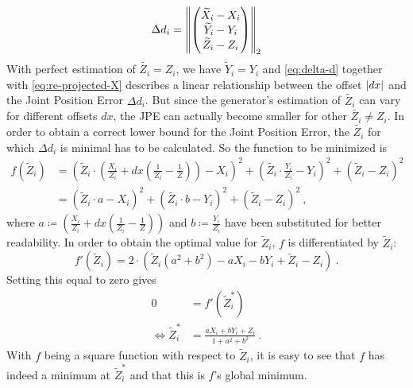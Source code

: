 \begin{equation}
\label{eq:delta-d}
	\Delta d_i = \norm{ 
	\begin{pmatrix}
		\widetilde{X}_i - X_i \\
		\widetilde{Y}_i - Y_i \\
		\widetilde{Z}_i - Z_i
	\end{pmatrix}
	}_2
\end{equation}
With perfect estimation of $\widetilde{Z_i} = Z_i$, we have $\widetilde{Y}_i = Y_i$ and \autoref{eq:delta-d} together with \autoref{eq:re-projected-X} describes a linear relationship between the offset $\abs{dx}$ and the Joint Position Error $\Delta d_i$.
But since the generator's estimation of $\widetilde{Z_i}$ can vary for different offsets $dx$, the JPE can actually become smaller for other $\widetilde{Z_i} \neq Z_i$. 
In order to obtain a correct lower bound for the Joint Position Error, the $\widetilde{Z_i}$ for which $\Delta d_i$ is minimal has to be calculated.
So the function to be minimized is
\begin{align}
	\label{eq:minimum-distance}
	f(\widetilde{Z}_i) &= \left ( \widetilde{Z}_i \cdot \left( \frac{X_i}{Z_i} + dx \left( \frac{1}{Z_i} - \frac{1}{Z} \right) \right ) - X_i \right)^2 + \left ( \widetilde{Z_i} \cdot \frac{Y_i}{Z_i} - Y_i \right )^2 + \left ( \widetilde{Z}_i - Z_i \right ) ^2 \\
	&= \left ( \widetilde{Z}_i \cdot a - X_i \right)^2 + \left ( \widetilde{Z_i} \cdot b - Y_i \right )^2 + \left ( \widetilde{Z}_i - Z_i \right )^2 \ ,
\end{align}
where $a \coloneqq \left( \frac{X_i}{Z_i} + dx \left( \frac{1}{Z_i} - \frac{1}{Z} \right) \right )$ and $b \coloneqq \frac{Y_i}{Z_i}$ have been substituted for better readability.
In order to obtain the optimal value for $\widetilde{Z}_i$, $f$ is differentiated by $\widetilde{Z}_i$:
\begin{equation}
	\label{eq:derivative-minimum-distance}
	f'(\widetilde{Z}_i) = 2 \cdot \left ( \widetilde{Z}_i \left (a^2 + b^2 \right ) - a X_i - b Y_i + \widetilde{Z}_i - Z_i \right ) \ .
\end{equation}
Setting this equal to zero gives
\begin{align}
	0 &= f'(\widetilde{Z}_i^\ast) \\
	\Leftrightarrow \widetilde{Z}_i^\ast & = \frac{a X_i + b Y_i + Z_i}{1 + a^2 + b^2} \ .
	\label{eq:z_i-min}
\end{align}
With $f$ being a square function with respect to $\widetilde{Z}_i$, it is easy to see that $f$ has indeed a minimum at $\widetilde{Z}_i^\ast$ and that this is $f$'s global minimum.
